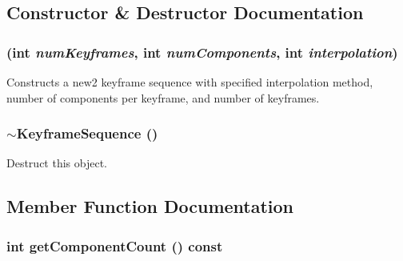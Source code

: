\subsection{Constructor \& Destructor Documentation}
\hypertarget{classm3g_1_1KeyframeSequence_0c07c479375c11ff94cff02c1267f0d0}{
\subsubsection[{KeyframeSequence}]{ (int {\em numKeyframes}, \/  int {\em numComponents}, \/  int {\em interpolation})}}
\label{classm3g_1_1KeyframeSequence_0c07c479375c11ff94cff02c1267f0d0}


Constructs a new2 keyframe sequence with specified interpolation method, number of components per keyframe, and number of keyframes. \hypertarget{classm3g_1_1KeyframeSequence_464f5929e3302c788ca626c11ca8d656}{
\subsubsection[{$\sim$KeyframeSequence}]{\setlength{\rightskip}{0pt plus 5cm}$\sim${\bf KeyframeSequence} ()}}
\label{classm3g_1_1KeyframeSequence_464f5929e3302c788ca626c11ca8d656}


Destruct this object. 

\subsection{Member Function Documentation}
\hypertarget{classm3g_1_1KeyframeSequence_7016f51d2788e78fdd736efd040f5e5e}{
\subsubsection[{getComponentCount}]{\setlength{\rightskip}{0pt plus 5cm}int getComponentCount () const}}
\label{classm3g_1_1KeyframeSequence_7016f51d2788e78fdd736efd040f5e5e}


